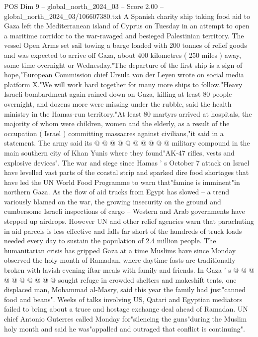 \begin{textsample}{POS Dim 9 – global\_north\_2024\_03 – Score 2.00 – global\_north\_2024\_03/106607380.txt}  \label{ex:f9_pos_197}
A Spanish charity ship taking food aid to Gaza left the Mediterranean island of Cyprus on Tuesday in an attempt to open a maritime corridor to the war-ravaged and besieged Palestinian territory.
The vessel Open Arms set sail towing a barge loaded with 200 tonnes of relief goods and was expected to arrive off Gaza, about 400 kilometres ( 250 miles ) away, some time overnight or Wednesday."The departure of the first ship is a sign of hope,"European Commission chief Ursula von der Leyen wrote on social media platform X."We will work hard together for many more ships to follow."Heavy Israeli bombardment again rained down on Gaza, killing at least 80 people overnight, and dozens more were missing under the rubble, said the health ministry in the Hamas-run territory."At least 80 martyrs arrived at hospitals, the majority of whom were children, women and the elderly, as a result of the occupation ( Israel ) committing massacres against civilians,"it said in a statement.
The army said its @ @ @ @ @ @ @ @ @ @ military compound in the main southern city of Khan Yunis where they found"AK-47 rifles, vests and explosive devices".
The war and siege since Hamas ' s October 7 attack on Israel have levelled vast parts of the coastal strip and sparked dire food shortages that have led the UN World Food Programme to warn that"famine is imminent"in northern Gaza.
As the flow of aid trucks from Egypt has slowed -- a trend variously blamed on the war, the growing insecurity on the ground and cumbersome Israeli inspections of cargo -- Western and Arab governments have stepped up airdrops.
However UN and other relief agencies warn that parachuting in aid parcels is less effective and falls far short of the hundreds of truck loads needed every day to sustain the population of 2.4 million people.
The humanitarian crisis has gripped Gaza at a time Muslims have since Monday observed the holy month of Ramadan, where daytime fasts are traditionally broken with lavish evening iftar meals with family and friends.
In Gaza ' s @ @ @ @ @ @ @ @ @ @ sought refuge in crowded shelters and makeshift tents, one displaced man, Mohammad al-Masry, said this year the family had just"canned food and beans".
Weeks of talks involving US, Qatari and Egyptian mediators failed to bring about a truce and hostage exchange deal ahead of Ramadan.
UN chief Antonio Guterres called Monday for"silencing the guns"during the Muslim holy month and said he was"appalled and outraged that conflict is continuing".

\end{textsample}
